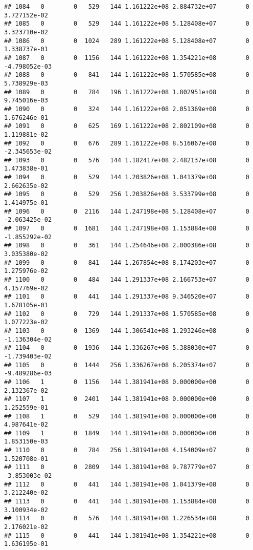 \documentclass[
]{article}
\begin{document}
\begin{enumerate}
\begin{verbatim}
## 1084   0        0   529   144 1.161222e+08 2.884732e+07        0  3.727152e-02
## 1085   0        0   529   144 1.161222e+08 5.128408e+07        0  3.323710e-02
## 1086   0        0  1024   289 1.161222e+08 5.128408e+07        0  1.338737e-01
## 1087   0        0  1156   144 1.161222e+08 1.354221e+08        0 -4.798052e-03
## 1088   0        0   841   144 1.161222e+08 1.570585e+08        0  5.738929e-03
## 1089   0        0   784   196 1.161222e+08 1.802951e+08        0  9.745016e-03
## 1090   0        0   324   144 1.161222e+08 2.051369e+08        0  1.676246e-01
## 1091   0        0   625   169 1.161222e+08 2.802109e+08        0  1.119881e-02
## 1092   0        0   676   289 1.161222e+08 8.516067e+08        0 -2.345653e-02
## 1093   0        0   576   144 1.182417e+08 2.482137e+08        0  1.473838e-01
## 1094   0        0   529   144 1.203826e+08 1.041379e+08        0  2.662635e-02
## 1095   0        0   529   256 1.203826e+08 3.533799e+08        0  1.414975e-01
## 1096   0        0  2116   144 1.247198e+08 5.128408e+07        0 -2.063425e-02
## 1097   0        0  1681   144 1.247198e+08 1.153884e+08        0 -1.855292e-02
## 1098   0        0   361   144 1.254646e+08 2.000386e+08        0  3.035380e-02
## 1099   0        0   841   144 1.267854e+08 8.174203e+07        0  1.275976e-02
## 1100   0        0   484   144 1.291337e+08 2.166753e+07        0  4.157769e-02
## 1101   0        0   441   144 1.291337e+08 9.346520e+07        0  1.678105e-01
## 1102   0        0   729   144 1.291337e+08 1.570585e+08        0  1.077223e-02
## 1103   0        0  1369   144 1.306541e+08 1.293246e+08        0 -1.136304e-02
## 1104   0        0  1936   144 1.336267e+08 5.388030e+07        0 -1.739403e-02
## 1105   0        0  1444   256 1.336267e+08 6.205374e+07        0 -9.489286e-03
## 1106   1        0  1156   144 1.381941e+08 0.000000e+00        0  2.132367e-02
## 1107   1        0  2401   144 1.381941e+08 0.000000e+00        0  1.252559e-01
## 1108   1        0   529   144 1.381941e+08 0.000000e+00        0  4.987641e-02
## 1109   1        0  1849   144 1.381941e+08 0.000000e+00        0  1.853150e-03
## 1110   0        0   784   256 1.381941e+08 4.154009e+07        0  1.520708e-01
## 1111   0        0  2809   144 1.381941e+08 9.787779e+07        0 -3.853003e-02
## 1112   0        0   441   144 1.381941e+08 1.041379e+08        0  3.212240e-02
## 1113   0        0   441   144 1.381941e+08 1.153884e+08        0  3.100934e-02
## 1114   0        0   576   144 1.381941e+08 1.226534e+08        0  2.176021e-02
## 1115   0        0   441   144 1.381941e+08 1.354221e+08        0  1.636195e-01

\end{verbatim}
\end{enumerate}
\end{document}
